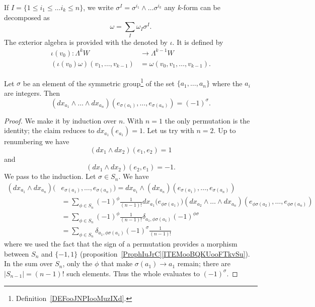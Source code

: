 If $I=\{1\leq i_1\leq\ldots i_k\leq n\}$, we write $\sigma^I=\sigma^{i_1}\wedge\ldots\sigma^{i_k}$ any $k$-form can be decomposed as
\[
  \omega=\sum_{I}\omega_I\sigma^I.
\]
The exterior algebra is provided with the  denoted by $\iota$. It is defined by\label{pg_DefProdExt}
\begin{equation}
\begin{aligned}
 \iota(v_0)\colon\Lambda^kW&\to \Lambda^{k-1}W \\
(\iota(v_0)\omega)(v_1,\ldots,v_{k-1})& =\omega(v_0,v_1,\ldots,v_{k-1}).
\end{aligned}
\end{equation}

\begin{lemma}
    Let \( \sigma\) be an element of the symmetric group\footnote{Definition~\ref{DEFooJNPIooMuzIXd}.} of the set \( \{ a_1,\ldots, a_n \}\) where the \( a_i\) are integers. Then
    \begin{equation}
        (dx_{a_1}\wedge\ldots \wedge dx_{a_n})(e_{\sigma(a_1)},\ldots, e_{\sigma(a_n)})=(-1)^{\sigma}.
    \end{equation}
\end{lemma}

\begin{proof}
    We make it by induction over \( n\). With \( n=1\) the only permutation is the identity; the claim reduces to \( dx_{a_1}(e_{a_1})=1\). Let us try with \( n=2\). Up to renumbering we have
    \begin{equation}
        (dx_1\wedge dx_2)(e_1,e_2)=1
    \end{equation}
    and
    \begin{equation}
        (dx_1\wedge dx_2)(e_2,e_1)=-1.
    \end{equation}
    We pass to the induction. Let \( \sigma\in S_n\). We have
    \begin{subequations}
        \begin{align}
            (dx_{a_1}\wedge dx_{a_n})(&e_{\sigma(a_1)},\ldots, e_{\sigma(a_n)})=dx_{a_1}\wedge (dx_{a_n})(e_{\sigma(a_1)},\ldots, e_{\sigma(a_n)})\\
            &=\sum_{\phi\in S_n}(-1)^{\phi}\frac{1}{ (n-1)! }dx_{a_1}\big( e_{\phi\sigma(a_1)} \big)(dx_{a_2}\wedge\ldots\wedge dx_{a_n})(e_{\phi\sigma(a_2)},\ldots, e_{\phi\sigma(a_n)})\\
            &=\sum_{\phi\in S_n}(-1)^{\phi}\frac{1}{ (n-1)! }\delta_{a_1,\phi\sigma(a_1)}(-1)^{\phi\sigma}\\
            &=\sum_{\phi\in S_n}\delta_{a_1,\phi\sigma(a_1)}(-1)^{\sigma}\frac{1}{ (n-1)! }
        \end{align}
    \end{subequations}
    where we used the fact that the sign of a permutation provides a morphism between \( S_n\) and \( \{ -1,1 \}\) (proposition~\ref{ProphIuJrC}\ref{ITEMooBQKUooFTkvSu}). In the sum over \( S_n\), only the \( \phi\) that make \( \sigma(a_1)\to a_1\) remain; there are \( | S_{n-1} |=(n-1)!\) such elements. Thus the whole evaluates to \( (-1)^{\sigma}\).
\end{proof}

